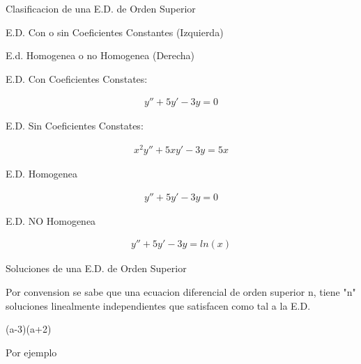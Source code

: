 \documentclass{article}
\begin{document}
Clasificacion de una E.D. de Orden Superior

E.D. Con o sin Coeficientes Constantes (Izquierda)

E.d. Homogenea o no Homogenea (Derecha)



E.D. Con Coeficientes Constates:


\begin{gather*}
y''+5y'-3y = 0
\end{gather*}


E.D. Sin Coeficientes Constates:


\begin{gather*}
x^{2}y''+5xy'-3y = 5x
\end{gather*}


E.D. Homogenea


\begin{gather*}
y''+5y'-3y = 0
\end{gather*}


E.D. NO Homogenea


\begin{gather*}
y''+5y'-3y = ln(x)
\end{gather*}




Soluciones de una E.D. de Orden Superior

Por convension se sabe que una ecuacion diferencial de orden superior n, tiene "n" soluciones \colorbox[RGB]{248,231,28}{linealmente independientes} que satisfacen como tal a la E.D.

(a-3)(a+2)

Por ejemplo
\end{document}
